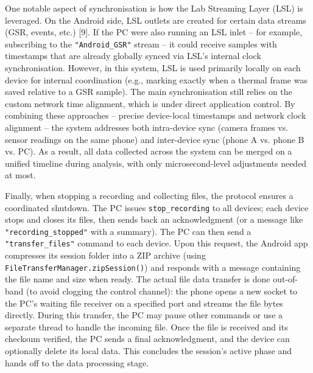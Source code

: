 One notable aspect of synchronisation is how the Lab Streaming Layer (LSL) is leveraged. On the Android side, LSL outlets are created for certain data streams (GSR, events, etc.) [9]. If the PC were also running an LSL inlet -- for example, subscribing to the \texttt{"Android\_GSR"} stream -- it could receive samples with timestamps that are already globally synced via LSL's internal clock synchronisation. However, in this system, LSL is used primarily locally on each device for internal coordination (e.g., marking exactly when a thermal frame was saved relative to a GSR sample). The main synchronisation still relies on the custom network time alignment, which is under direct application control. By combining these approaches -- precise device-local timestamps and network clock alignment -- the system addresses both intra-device sync (camera frames vs. sensor readings on the same phone) and inter-device sync (phone A vs. phone B vs. PC). As a result, all data collected across the system can be merged on a unified timeline during analysis, with only microsecond-level adjustments needed at most.

Finally, when stopping a recording and collecting files, the protocol ensures a coordinated shutdown. The PC issues \texttt{stop\_recording} to all devices; each device stops and closes its files, then sends back an acknowledgment (or a message like \texttt{"recording\_stopped"} with a summary). The PC can then send a \texttt{"transfer\_files"} command to each device. Upon this request, the Android app compresses its session folder into a ZIP archive (using \texttt{FileTransferManager.zipSession()}) and responds with a message containing the file name and size when ready. The actual file data transfer is done out-of-band (to avoid clogging the control channel): the phone opens a new socket to the PC's waiting file receiver on a specified port and streams the file bytes directly. During this transfer, the PC may pause other commands or use a separate thread to handle the incoming file. Once the file is received and its checksum verified, the PC sends a final acknowledgment, and the device can optionally delete its local data. This concludes the session's active phase and hands off to the data processing stage.

